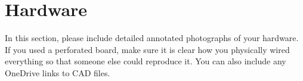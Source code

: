 \section{Hardware}
In this section, please include detailed annotated photographs of your hardware. If you used a perforated board, make sure it is clear how you physically wired everything so that someone else could reproduce it. You can also include any OneDrive links to CAD files. 